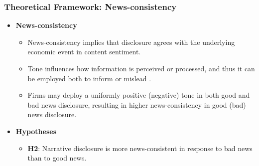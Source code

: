 \documentclass{beamer}
\begin{document}
\begin{frame}
	\frametitle{Theoretical Framework: News-consistency}
	\begin{itemize}
		\item \textbf{News-consistency}
		
		\begin{itemize}
			\item News-consistency implies that disclosure agrees with the underlying economic event in content sentiment. %
			\item Tone influences how information is perceived or processed, and thus it can be employed both to inform or mislead \citep{davisNumbersMeasuringInformation2012, liInformationContentForwardLooking2010, huangToneManagement2014}.
			\item Firms may deploy a uniformly positive (negative) tone in both good and bad news disclosure, resulting in higher news-consistency in good (bad) news disclosure.
		\end{itemize}
		
		\item \textbf{Hypotheses}
		
		\begin{itemize}
			\item  \textbf{H2}: Narrative disclosure is more news-consistent in response to bad news than to good news.
		\end{itemize}
		
	\end{itemize}
\end{frame}
\end{document}
